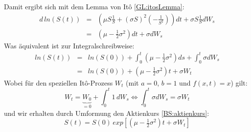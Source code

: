 Damit ergibt sich mit dem Lemma von Itô \ref{GL:itosLemma}:
\begin{eqnarray*}
d\, ln(S(t)) & = & \left(\mu S \frac{1}{S} + \left(\sigma S\right)^2\left(-\frac{1}{S^2}\right)\right)dt + \sigma S\frac{1}{S} dW_s \\
& = & \left(\mu - \frac{1}{2}\sigma^2\right)dt + \sigma dW_s
\end{eqnarray*}
Was äquivalent ist zur Integralschreibweise:
\begin{eqnarray*}
ln(S(t)) & = & ln(S(0)) + \int _0^t \left(\mu - \frac{1}{2}\sigma^2\right)ds + \int _0^t \sigma dW_s \\
& = & ln(S(0)) + \left(\mu - \frac{1}{2}\sigma^2\right)t + \sigma W_t 
\end{eqnarray*}
Wobei für den speziellen Itô-Prozess $W_t$ (mit $ a = 0 $, $ b = 1$ und $f(x,t) = x$) gilt:
\begin{equation*}
W_t = \underbrace{W_0}_{=0} + \int _0^t 1 \, dW_s \Leftrightarrow \int _0^t \sigma dW_s = \sigma W_t 
\end{equation*}
und wir erhalten durch Umformung den Aktienkurs \ref{BS:aktienkurs}:
\begin{equation*}
S(t) = S(0)\,exp\left[ \left( \mu - \tfrac{1}{2}\sigma^2\right)t + \sigma W_t\right]
\end{equation*}



